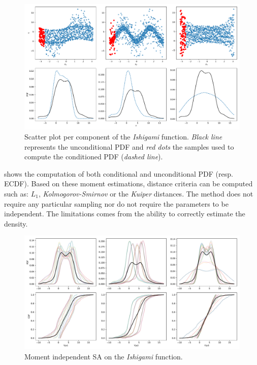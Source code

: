 \begin{figure}[!h]
\centering
\includegraphics[width=\linewidth,keepaspectratio]{fig/literature/scatter_moments.pdf}
\caption{Scatter plot per component of the \textit{Ishigami} function. \emph{Black line} represents the unconditional PDF and \emph{red dots} the samples used to compute the conditioned PDF (\emph{dashed line}).}
\label{fig:scatter_moments}
\end{figure}

 shows the computation of both conditional and unconditional PDF (resp. ECDF). Based on these moment estimations, distance criteria can be computed such as: $L_1$, \emph{Kolmogorov-Smirnov} or the \emph{Kuiper} distances. The method does not require any particular sampling nor do not require the parameters to be independent. The limitations comes from the ability to correctly estimate the density.

\begin{figure}[!h]
\centering
\includegraphics[width=\linewidth,keepaspectratio]{fig/literature/moment_independent-ishigami.pdf}
\caption{Moment independent SA on the \emph{Ishigami} function.}
\label{fig:moment_sa}
\end{figure}

